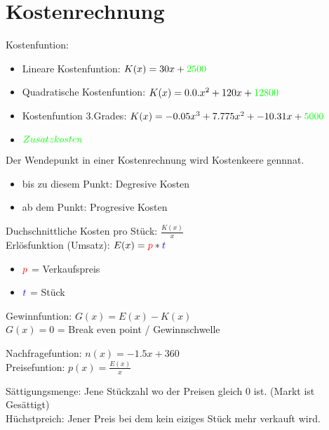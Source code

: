 \newpage
\section{Kostenrechnung}

\hfill \break
Kostenfuntion:
\begin{itemize}
    \item Lineare Kostenfuntion: $K(x)=30x+\textcolor{green}{2500}$
    \item Quadratische Kostenfuntion: $K(x)=0.0.x^2+120x+\textcolor{green}{12800}$
    \item Kostenfuntion 3.Grades: $K(x)=-0.05x^3+7.775x^2+-10.31x+\textcolor{green}{5000}$
\end{itemize}

\begin{itemize}
    \item $\textcolor{green}{Zusatzkosten}$
\end{itemize}


\hfill \break
Der Wendepunkt in einer Kostenrechnung wird Kostenkeere gennnat.
\begin{itemize}
    \item bis zu diesem Punkt: Degresive Kosten
    \item ab dem Punkt: Progresive Kosten
\end{itemize}

\hfill \break
Duchschnittliche Kosten pro Stück: $\frac{K(x)}{x}$\\

\hfill \break
Erlösfunktion (Umsatz): $E(x) = \textcolor{red}{p}*\textcolor{blue}{t}$\\
\begin{itemize}
    \item $\textcolor{red}{p}$ = Verkaufspreis
    \item $\textcolor{blue}{t}$ = Stück
\end{itemize}

\hfill \break
Gewinnfuntion: $G(x) = E(x)-K(x)$\\
$G(x)=0$ = Break even point / Gewinnschwelle

\hfill \break
Nachfragefuntion: $n(x) = -1.5x+360$\\
Preisefuntion: $p(x) = \frac{E(x)}{x}$

\hfill \break
Sättigungsmenge: Jene Stückzahl wo der Preisen gleich 0 ist. (Markt ist Gesättigt)\\
Hüchstpreich: Jener Preis bei dem kein eiziges Stück mehr verkauft wird.
